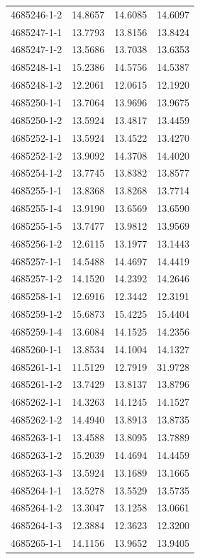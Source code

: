 \begin{longtable}{lrrr}
4685246-1-2 & 14.8657 & 14.6085 & 14.6097 \\
4685247-1-1 & 13.7793 & 13.8156 & 13.8424 \\
4685247-1-2 & 13.5686 & 13.7038 & 13.6353 \\
4685248-1-1 & 15.2386 & 14.5756 & 14.5387 \\
4685248-1-2 & 12.2061 & 12.0615 & 12.1920 \\
4685250-1-1 & 13.7064 & 13.9696 & 13.9675 \\
4685250-1-2 & 13.5924 & 13.4817 & 13.4459 \\
4685252-1-1 & 13.5924 & 13.4522 & 13.4270 \\
4685252-1-2 & 13.9092 & 14.3708 & 14.4020 \\
4685254-1-2 & 13.7745 & 13.8382 & 13.8577 \\
4685255-1-1 & 13.8368 & 13.8268 & 13.7714 \\
4685255-1-4 & 13.9190 & 13.6569 & 13.6590 \\
4685255-1-5 & 13.7477 & 13.9812 & 13.9569 \\
4685256-1-2 & 12.6115 & 13.1977 & 13.1443 \\
4685257-1-1 & 14.5488 & 14.4697 & 14.4419 \\
4685257-1-2 & 14.1520 & 14.2392 & 14.2646 \\
4685258-1-1 & 12.6916 & 12.3442 & 12.3191 \\
4685259-1-2 & 15.6873 & 15.4225 & 15.4404 \\
4685259-1-4 & 13.6084 & 14.1525 & 14.2356 \\
4685260-1-1 & 13.8534 & 14.1004 & 14.1327 \\
4685261-1-1 & 11.5129 & 12.7919 & 31.9728 \\
4685261-1-2 & 13.7429 & 13.8137 & 13.8796 \\
4685262-1-1 & 14.3263 & 14.1245 & 14.1527 \\
4685262-1-2 & 14.4940 & 13.8913 & 13.8735 \\
4685263-1-1 & 13.4588 & 13.8095 & 13.7889 \\
4685263-1-2 & 15.2039 & 14.4694 & 14.4459 \\
4685263-1-3 & 13.5924 & 13.1689 & 13.1665 \\
4685264-1-1 & 13.5278 & 13.5529 & 13.5735 \\
4685264-1-2 & 13.3047 & 13.1258 & 13.0661 \\
4685264-1-3 & 12.3884 & 12.3623 & 12.3200 \\
4685265-1-1 & 14.1156 & 13.9652 & 13.9405 \\

\end{longtable}
